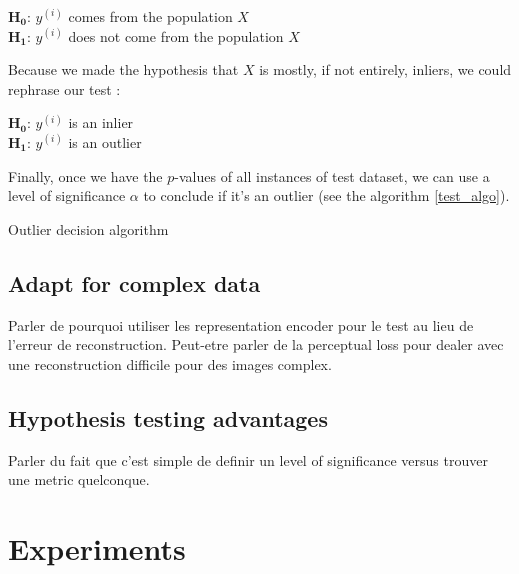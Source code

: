 \documentclass{article}
\begin{document}
\begin{center}
$\boldsymbol{H_0}$: $y^{(i)}$ comes from the population $X$ \\
$\boldsymbol{H_1}$: $y^{(i)}$ does not come from the population $X$
\end{center}

\noindent Because we made the hypothesis that $X$ is mostly, if not entirely, inliers, we could rephrase our test :

\begin{center}
	$\boldsymbol{H_0}$: $y^{(i)}$ is an inlier \\
	$\boldsymbol{H_1}$: $y^{(i)}$ is an outlier
\end{center}

Finally, once we have the $p$-values of all instances of test dataset, we can use a level of significance $\alpha$ to conclude if it's an outlier (see the algorithm \ref{test_algo}).

\begin{center}
	\begin{algorithm}[H] \label{test_algo}
		\SetAlgoLined
		\caption{Outlier decision algorithm}
	\end{algorithm}
\end{center}

\subsection{Adapt for complex data}

Parler de pourquoi utiliser les representation encoder pour le test au lieu de l'erreur de reconstruction. Peut-etre parler de la perceptual loss pour dealer avec une reconstruction difficile pour des images complex.

\subsection{Hypothesis testing advantages}

Parler du fait que c'est simple de definir un level of significance versus trouver une metric quelconque.

\section{Experiments}
\end{document}
